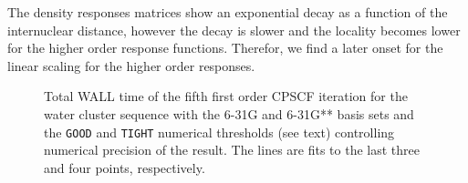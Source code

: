 \documentclass[prl,aps,twocolumn,showpacs,twocolumngrid,superbib]{revtex4}
\begin{document}
The density responses matrices show an exponential decay as a function
of the internuclear distance, however the decay is slower and the locality
becomes lower for the higher order response functions.
Therefor, we find a later onset for the linear scaling for the higher order
responses.



\begin{figure}[t]
  \caption{\protect
    Total WALL time of the fifth first order CPSCF iteration for
    the water cluster sequence with the 6-31G and 6-31G** 
    basis sets and the {\tt GOOD} and {\tt TIGHT} 
    numerical thresholds (see text) controlling numerical
    precision of the result. The lines are fits to the 
    last three and four points, respectively.
  }\label{Alpha_scaling}
\end{figure}
\end{document}
